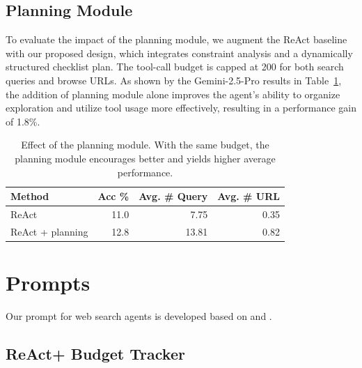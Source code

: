 \subsection{Planning Module}\label{app:early}
To evaluate the impact of the planning module, we augment the ReAct baseline with our proposed design, which integrates constraint analysis and a dynamically structured checklist plan. The tool-call budget is capped at 200 for both search queries and browse URLs. As shown by the Gemini-2.5-Pro results in Table~\ref{tab:abl_plan}, the addition of planning module alone improves the agent’s ability to organize exploration and utilize tool usage more effectively, resulting in a performance gain of 1.8\%. 

\begin{table}[h]
\centering
\caption{Effect of the planning module. With the same budget, the planning module encourages better  and yields higher average performance.}
\begin{tabular}{lrrr}
\toprule
\textbf{Method} & \textbf{Acc \%} & \textbf{Avg. \# Query} & \textbf{Avg. \# URL} \\
\midrule
ReAct & 11.0 & 7.75 & 0.35 \\
ReAct + planning & 12.8 & 13.81 & 0.82 \\
\bottomrule
\end{tabular}
\label{tab:abl_plan}
\end{table}









\section{Prompts}\label{app:prompts}

Our prompt for web search agents is developed based on \citet{DBLP:journals/corr/abs-2503-09516} and \citet{DBLP:journals/corr/abs-2507-02592}.

\subsection{ReAct+ Budget Tracker}\label{app:prompt_budget}

